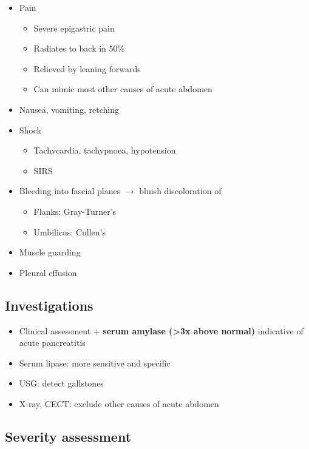 \documentclass[
  12pt,
]{memoir}
\providecommand{\tightlist}{%
  \setlength{\itemsep}{0pt}\setlength{\parskip}{0pt}}
\begin{document}
\begin{itemize}
\tightlist
\item
  Pain

  \begin{itemize}
  \tightlist
  \item
    Severe epigastric pain
  \item
    Radiates to back in 50\%
  \item
    Relieved by leaning forwards
  \item
    Can mimic most other causes of acute abdomen
  \end{itemize}
\item
  Nausea, vomiting, retching
\item
  Shock

  \begin{itemize}
  \tightlist
  \item
    Tachycardia, tachypnoea, hypotension
  \item
    SIRS
  \end{itemize}
\item
  Bleeding into fascial planes \(\rightarrow\) bluish discoloration of

  \begin{itemize}
  \tightlist
  \item
    Flanks: Gray-Turner's
  \item
    Umbilicus: Cullen's
  \end{itemize}
\item
  Muscle guarding
\item
  Pleural effusion
\end{itemize}

\hypertarget{investigations-9}{%
\subsection{Investigations}\label{investigations-9}}

\begin{itemize}
\tightlist
\item
  Clinical assessment + \textbf{serum amylase (\textgreater3x above
  normal)} indicative of acute pancreatitis
\item
  Serum lipase: more sensitive and specific
\item
  USG: detect gallstones
\item
  X-ray, CECT: exclude other causes of acute abdomen
\end{itemize}

\hypertarget{severity-assessment}{%
\subsection{Severity assessment}\label{severity-assessment}}
\end{document}
